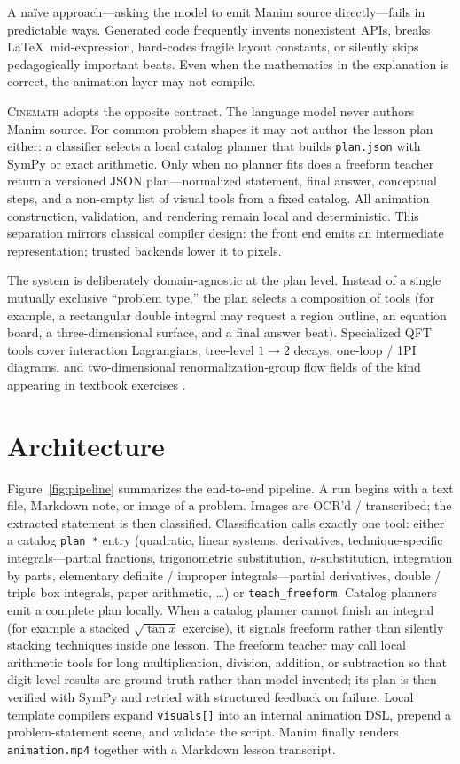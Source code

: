 \documentclass[11pt]{article}
\begin{document}
A na\"ive approach---asking the model to emit Manim source directly---fails
in predictable ways. Generated code frequently invents nonexistent APIs,
breaks \LaTeX \ mid-expression, hard-codes fragile layout constants, or
silently skips pedagogically important beats. Even when the mathematics in
the explanation is correct, the animation layer may not compile.

\textsc{Cinemath} adopts the opposite contract. The language model never
authors Manim source. For common problem shapes it may not author the lesson
plan either: a classifier selects a local catalog planner that builds
\texttt{plan.json} with SymPy or exact arithmetic. Only when no planner fits
does a freeform teacher return a versioned JSON plan---normalized statement,
final answer, conceptual steps, and a non-empty list of visual tools from a
fixed catalog. All animation construction, validation, and rendering remain
local and deterministic. This separation mirrors classical compiler design:
the front end emits an intermediate representation; trusted backends lower it
to pixels.

The system is deliberately domain-agnostic at the plan level. Instead of a
single mutually exclusive ``problem type,'' the plan selects a composition of
tools (for example, a rectangular double integral may request a region
outline, an equation board, a three-dimensional surface, and a final answer
beat). Specialized QFT tools cover interaction Lagrangians, tree-level
$1\to 2$ decays, one-loop / 1PI diagrams, and two-dimensional
renormalization-group flow fields of the kind appearing in textbook exercises
\citep{peskin1995introduction}.

\section{Architecture}

Figure~\ref{fig:pipeline} summarizes the end-to-end pipeline. A run begins
with a text file, Markdown note, or image of a problem. Images are OCR'd /
transcribed; the extracted statement is then classified. Classification calls
exactly one tool: either a catalog \texttt{plan\_*} entry (quadratic, linear
systems, derivatives, technique-specific integrals---partial fractions,
trigonometric substitution, $u$-substitution, integration by parts, elementary
definite / improper integrals---partial derivatives, double / triple box
integrals, paper arithmetic, \ldots) or \texttt{teach\_freeform}. Catalog
planners emit a complete plan locally. When a catalog planner cannot finish
an integral (for example a stacked $\sqrt{\tan x}$ exercise), it signals
freeform rather than silently stacking techniques inside one lesson. The
freeform teacher may call local arithmetic tools for long multiplication,
division, addition, or subtraction so that digit-level results are
ground-truth rather than model-invented; its plan is then verified with SymPy
and retried with structured feedback on failure. Local template compilers
expand \texttt{visuals[]} into an internal animation DSL, prepend a
problem-statement scene, and validate the script. Manim finally renders
\texttt{animation.mp4} together with a Markdown lesson transcript.
\end{document}
